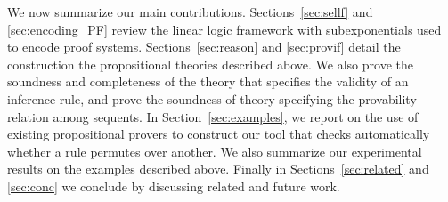 We now summarize our main contributions. Sections~\ref{sec:sellf} and
\ref{sec:encoding_PF}
review the linear logic framework with subexponentials used to encode
proof systems. Sections~\ref{sec:reason} and \ref{sec:provif} detail the
construction the propositional theories described above. We also
prove the
soundness and completeness of the theory that specifies the validity of 
an inference rule, and prove the soundness of
theory specifying the provability relation among sequents. In
Section~\ref{sec:examples}, we report on the use
of existing propositional provers to construct our tool that checks
automatically whether a rule permutes over another. We also summarize our
experimental results on the examples described above.
Finally in Sections~\ref{sec:related} and \ref{sec:conc} we conclude by
discussing related and future work.

% 
% 


